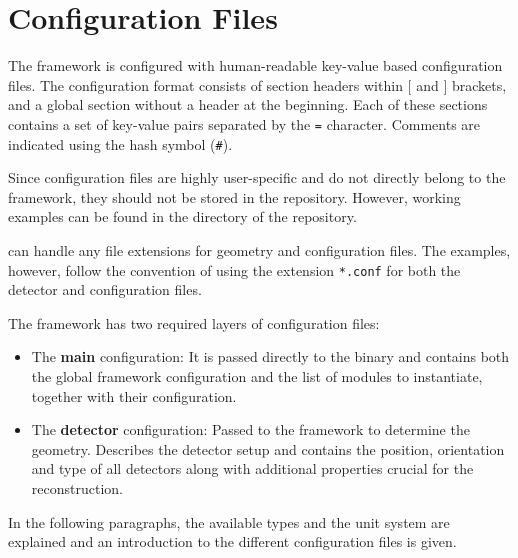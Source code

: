 \chapter{Configuration Files}
\label{ch:configuration_files}
The framework is configured with human-readable key-value based configuration files.
The configuration format consists of section headers within $[$ and $]$ brackets, and a global section without a header at the beginning.
Each of these sections contains a set of key-value pairs separated by the \texttt{=} character.
Comments are indicated using the hash symbol (\texttt{\#}).

Since configuration files are highly user-specific and do not directly belong to the \corry framework, they should not be stored in the \corry repository.
However, working examples can be found in the  directory of the repository.

\corry can handle any file extensions for geometry and configuration files.
The examples, however, follow the convention of using the extension \texttt{*.conf} for both the detector and configuration files.

The framework has two required layers of configuration files:
\begin{itemize}
  \item The \textbf{main} configuration: It is passed directly to the binary and contains both the global framework configuration and the list of modules to instantiate, together with their configuration.
  \item The \textbf{detector} configuration: Passed to the framework to determine the geometry.
  Describes the detector setup and contains the position, orientation and type of all detectors along with additional properties crucial for the reconstruction.
\end{itemize}

In the following paragraphs, the available types and the unit system are explained and an introduction to the different configuration files is given.

